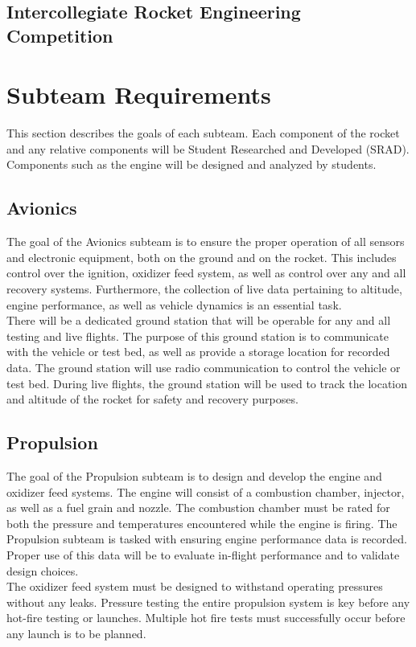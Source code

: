 \documentclass[12pt,article]{memoir}
\begin{document}
\section{Intercollegiate Rocket Engineering Competition}

\clearpage
\chapter{Subteam Requirements}
This section describes the goals of each subteam. Each component of the rocket and any relative components will be Student Researched and Developed (SRAD). Components such as the engine will be designed and analyzed by students. 


\section{Avionics}
The goal of the Avionics subteam is to ensure the proper operation of all sensors and electronic equipment, both on the ground and on the rocket. This includes control over the ignition, oxidizer feed system, as well as control over any and all recovery systems. Furthermore, the collection of live data pertaining to altitude, engine performance, as well as vehicle dynamics is an essential task.
\\
There will be a dedicated ground station that will be operable for any and all testing and live flights. The purpose of this ground station is to communicate with the vehicle or test bed, as well as provide a storage location for recorded data. The ground station will use radio communication to 
control the vehicle or test bed. During live flights, the ground station will be used to track the location and altitude of the rocket for safety and recovery purposes.

\section{Propulsion}
The goal of the Propulsion subteam is to design and develop the engine and oxidizer feed systems. The engine will consist of a combustion chamber, injector, as well as a fuel grain and nozzle. The combustion chamber must be rated for both the pressure and temperatures encountered while the engine is firing. The Propulsion subteam is tasked with ensuring engine performance data is recorded. Proper use of this data will be to evaluate in-flight performance and to validate design choices. 
\\
The oxidizer feed system must be designed to withstand operating pressures without any leaks. Pressure testing the entire propulsion system is key before any hot-fire testing or launches. Multiple hot fire tests must successfully occur before any launch is to be planned.
\end{document}
